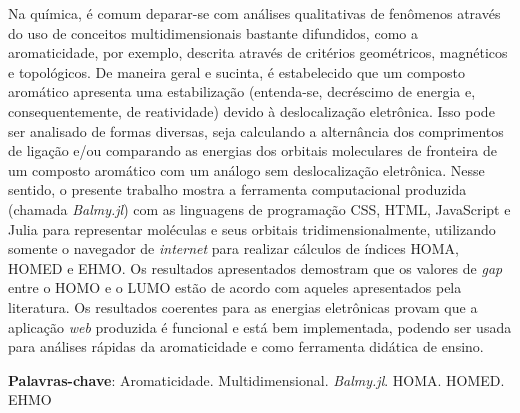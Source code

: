 
\setlength{\absparsep}{18pt} %
\begin{resumo}
	\SingleSpacing
    Na química, é comum deparar-se com análises qualitativas de fenômenos através do uso de conceitos multidimensionais bastante difundidos, como a aromaticidade, por exemplo, descrita através de critérios geométricos, magnéticos e topológicos. De maneira geral e sucinta, é estabelecido que um composto aromático apresenta uma estabilização (entenda-se, decréscimo de energia e, consequentemente, de reatividade) devido à deslocalização eletrônica. Isso pode ser analisado de formas diversas, seja calculando a alternância dos comprimentos de ligação e/ou comparando as energias dos orbitais moleculares de fronteira de um composto aromático com um análogo sem deslocalização eletrônica. Nesse sentido, o presente trabalho mostra a ferramenta computacional produzida (chamada \textit{Balmy.jl}) com as linguagens de programação \gls{CSS}, \gls{HTML}, JavaScript e Julia para representar moléculas e seus orbitais tridimensionalmente, utilizando somente o navegador de \textit{internet} para realizar cálculos de índices \gls{HOMA}, \gls{HOMED} e \gls{EHMO}. Os resultados apresentados demostram que os valores de \textit{gap} entre o \gls{HOMO} e o \gls{LUMO} estão de acordo com aqueles apresentados pela literatura. Os resultados coerentes para as energias eletrônicas provam que a aplicação \textit{web} produzida é funcional e está bem implementada, podendo ser usada para análises rápidas da aromaticidade e como ferramenta didática de ensino.
	
	\textbf{Palavras-chave}: Aromaticidade. Multidimensional. \textit{Balmy.jl}. \gls{HOMA}. \gls{HOMED}. \gls{EHMO}
\end{resumo}

